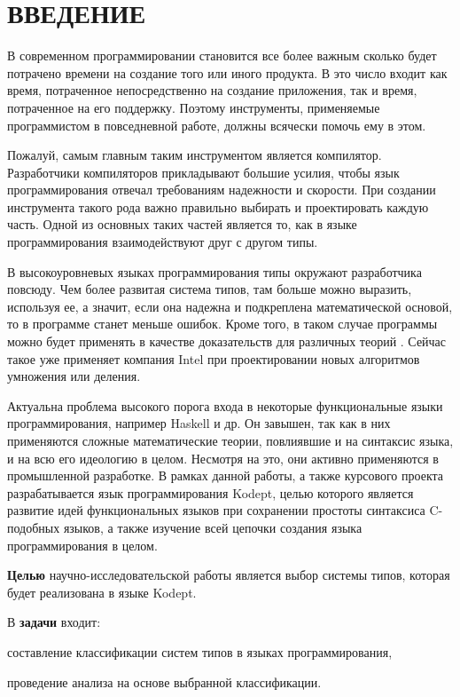 \chapter*{ВВЕДЕНИЕ}
\label{ch:introduction}


В современном программировании становится все более важным сколько будет потрачено времени на создание того или иного продукта.
В это число входит как время, потраченное непосредственно на создание приложения, так и время, потраченное на его поддержку.
Поэтому инструменты, применяемые программистом в повседневной работе, должны всячески помочь ему в этом.

Пожалуй, самым главным таким инструментом является компилятор.
Разработчики компиляторов прикладывают большие усилия, чтобы язык программирования отвечал требованиям надежности и скорости.
При создании инструмента такого рода важно правильно выбирать и проектировать каждую часть.
Одной из основных таких частей является то, как в языке программирования взаимодействуют друг с другом типы.

В высокоуровневых языках программирования типы окружают разработчика повсюду.
Чем более развитая система типов, там больше можно выразить, используя ее, а значит, если она надежна и подкреплена математической основой, то в программе станет меньше ошибок.
Кроме того, в таком случае программы можно будет применять в качестве доказательств для различных теорий \cite{AutoProvement}.
Сейчас такое уже применяет компания Intel при проектировании новых алгоритмов умножения или деления.

Актуальна проблема высокого порога входа в некоторые функциональные языки программирования, например Haskell и др.
Он завышен, так как в них применяются сложные математические теории, повлиявшие и на синтаксис языка, и на всю его идеологию в целом.
Несмотря на это, они активно применяются в промышленной разработке.
В рамках данной работы, а также курсового проекта разрабатывается язык программирования Kodept, целью которого является развитие идей функциональных языков при сохранении простоты синтаксиса C-подобных языков, а также изучение всей цепочки создания языка программирования в целом.

\textbf{Целью} научно-исследовательской работы является выбор системы типов, которая будет реализована в языке Kodept.

В \textbf{задачи} входит:
\begin{inparaenum}[1)]
    \item составление классификации систем типов в языках программирования,
    \item проведение анализа на основе выбранной классификации.
\end{inparaenum}

